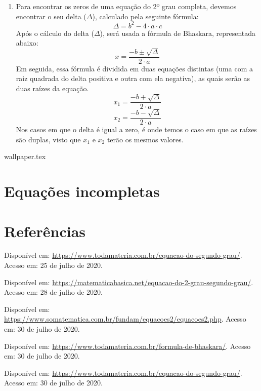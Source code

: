 \documentclass[10pt]{article}
\begin{document}
\begin{enumerate}[label=\textbf{(\roman*)}]
    
    \item Para encontrar os zeros de uma equação do 2º grau completa, devemos encontrar o seu delta (\( \Delta \)), calculado pela seguinte fórmula:
     \[ \Delta= b^2-4 \cdot a \cdot c \]
     Após o cálculo do delta (\( \Delta \)), será usada a fórmula de Bhaskara, representada abaixo:
     \[ x= \frac{-b \pm \sqrt{\Delta}}{2 \cdot a}\]
     Em seguida, essa fórmula é dividida em duas equações distintas (uma com a raiz quadrada do delta positiva e outra com ela negativa), as quais serão as duas raízes da equação.
    \[ x_1= \frac{-b + \sqrt{\Delta}}{2 \cdot a}\]
    \[ x_2= \frac{-b - \sqrt{\Delta}}{2 \cdot a}\]
    Nos casos em que o delta é igual a zero, é onde temos o caso em que as raízes são duplas, visto que \( x_1 \) e \( x_2 \) terão os mesmos valores.
\end{enumerate}
\newpage
{wallpaper.tex} %
\section*{Equações incompletas}



\vfill
\section*{Referências}
\noindent Disponível em: \url{https://www.todamateria.com.br/equacao-do-segundo-grau/}. Acesso em: 25 de julho de 2020.

\noindent Disponível em: \url{https://matematicabasica.net/equacao-do-2-grau-segundo-grau/}. Acesso em: 28 de julho de 2020.

\noindent Disponível em: \url{https://www.somatematica.com.br/fundam/equacoes2/equacoes2.php}. Acesso em: 30 de julho de 2020.

\noindent Disponível em: \url{https://www.todamateria.com.br/formula-de-bhaskara/}. Acesso em: 30 de julho de 2020.

\noindent Disponível em: \url{https://www.todamateria.com.br/equacao-do-segundo-grau/}. Acesso em: 30 de julho de 2020.
\end{document}
